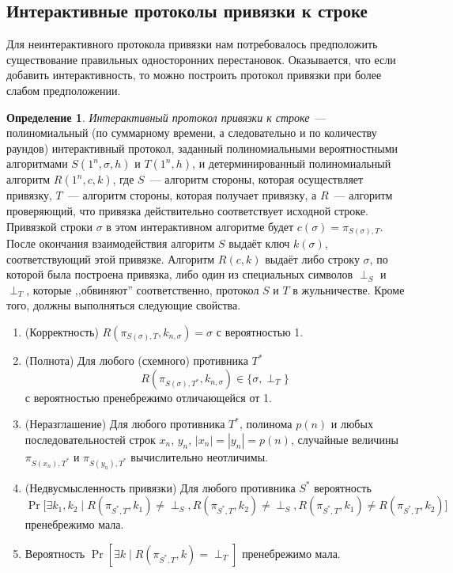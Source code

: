 \documentclass[12pt,a4paper]{article}
\theoremstyle{definition}
\newtheorem{definition}{Определение}[section]
\theoremstyle{plain}
\theoremstyle{remark}
\begin{document}
\subsection{Интерактивные протоколы привязки к строке}
Для неинтерактивного протокола привязки нам потребовалось предположить
существование правильных односторонних перестановок. Оказывается,
что если добавить интерактивность, то можно построить протокол привязки
при более слабом предположении.
\begin{definition}
\emph{Интерактивный протокол привязки к строке}~--- полиномиальный (по суммарному времени,
а следовательно и по количеству раундов) интерактивный протокол, заданный
полиномиальными вероятностными алгоритмами $S(1^n, \sigma, h)$ и $T(1^n, h)$, 
и детерминированный полиномиальный алгоритм $R(1^n, c,k)$,
где $S$~--- алгоритм стороны, которая осуществляет привязку, 
$T$~--- алгоритм стороны, которая получает привязку, а $R$~--- алгоритм
проверяющий, что привязка действительно соответствует исходной строке.
Привязкой строки $\sigma$ в этом интерактивном алгоритме будет $c(\sigma) = \pi_{S(\sigma), T}$. 
После окончания взаимодействия алгоритм $S$ выдаёт ключ $k(\sigma)$, 
соответствующий этой привязке.
Алгоритм $R(c,k)$ выдаёт либо строку $\sigma$, по которой была построена привязка,
либо один из специальных символов $\perp_S$ и $\perp_T$, которые ,,обвиняют'' соответственно,
протокол $S$ и $T$ в жульничестве. Кроме того, должны выполняться следующие свойства.
\begin{enumerate}
\item (Корректность) $R(\pi_{S(\sigma), T}, k_{n,\sigma}) = \sigma$ с вероятностью 1.
\item (Полнота) Для любого (схемного) противника $T^*$
$$R(\pi_{S(\sigma), T^*}, k_{n,\sigma}) \in \{\sigma, \perp_T\}$$
с вероятностью пренебрежимо отличающейся от 1.
\item (Неразглашение) Для любого противника $T^*$, полинома $p(n)$ и любых последовательностей строк $x_n$, $y_n$,
$|x_n|=|y_n|=p(n)$, случайные величины $\pi_{S(x_n), T^*}$ и $\pi_{S(y_n), T^*}$
вычислительно неотличимы.
\item (Недвусмысленность привязки) Для любого противника $S^*$ вероятность
$$\Pr\bigl[\exists k_1, k_2 \mid 
R(\pi_{S^*, T}, k_1)\neq \perp_S, 
R(\pi_{S^*, T}, k_2)\neq \perp_S, 
R(\pi_{S^*, T}, k_1)\neq R(\pi_{S^*, T}, k_2)
\bigr]$$
пренебрежимо мала.
\item Вероятность $\Pr[\exists k \mid R(\pi_{S^*,T}, k) = \perp_T]$ пренебрежимо мала.
\end{enumerate}
\end{definition}
\end{document}

